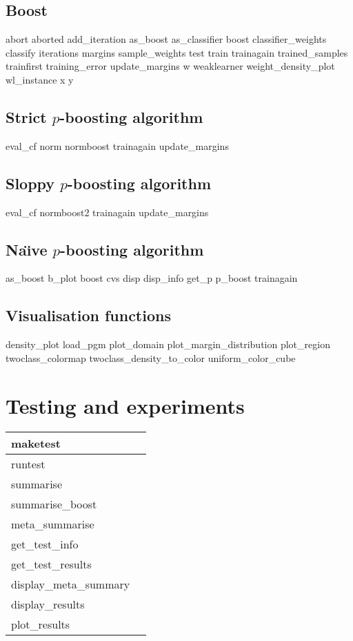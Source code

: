 \subsection{Boost}

abort
aborted
add\_iteration
as\_boost
as\_classifier
boost
classifier\_weights
classify
iterations
margins
sample\_weights
test
train
trainagain
trained\_samples
trainfirst
training\_error
update\_margins
w
weaklearner
weight\_density\_plot
wl\_instance
x
y

\subsection{Strict $p$-boosting algorithm}

eval\_cf
norm
normboost
trainagain
update\_margins

\subsection{Sloppy $p$-boosting algorithm}

eval\_cf
normboost2
trainagain
update\_margins

\subsection{Na\"{\i}ve $p$-boosting algorithm}

as\_boost
b\_plot
boost
cvs
disp
disp\_info
get\_p
p\_boost
trainagain


\subsection{Visualisation functions}

density\_plot
load\_pgm
plot\_domain
plot\_margin\_distribution
plot\_region
twoclass\_colormap
twoclass\_density\_to\_color
uniform\_color\_cube


\section{Testing and experiments}

\begin{tabular}{ll}
\hline
maketest		& \\
\hline
runtest			& \\
\hline
summarise		& \\
summarise\_boost	& \\
meta\_summarise		& \\
\hline
get\_test\_info		& \\
get\_test\_results	& \\
\hline
display\_meta\_summary	& \\
display\_results	& \\
plot\_results		& \\
\hline
\end{tabular}